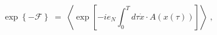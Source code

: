 \begin{equation}\label{eq:deff}
 \exp\left\{-{\mathcal F}\right\} \;=\; \left\langle 
\exp [- i e_N \int_{0}^T d\tau {\dot x} \cdot A(x(\tau)) ] \right\rangle \;,
\end{equation}

